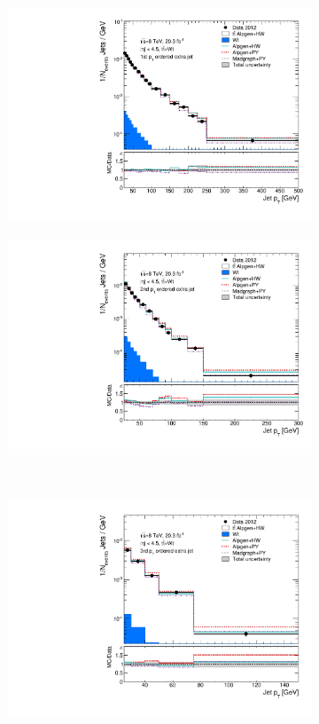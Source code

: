 \begin{figure}
\centering
\begin{subfigure}[]{0.45\textwidth}
\includegraphics[width=\textwidth]{fig/DataUnfold/LOMultiLeg/PtJet0.pdf}
\end{subfigure}
\begin{subfigure}[]{0.45\textwidth}
\includegraphics[width=\textwidth]{fig/DataUnfold/LOMultiLeg/PtJet1.pdf}
\end{subfigure} \\
\begin{subfigure}[]{0.45\textwidth}
\includegraphics[width=\textwidth]{fig/DataUnfold/LOMultiLeg/PtJet2.pdf}

\end{subfigure}
\end{figure}
